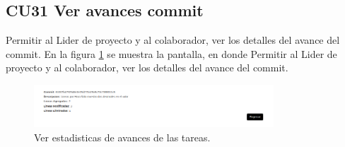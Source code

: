 \subsection{CU31 Ver avances commit}
{
\justify
{}
}

\justify
Permitir al Lider de proyecto y al colaborador, ver los detalles del avance del commit.
{
\justify
{}
}
\justify
En la figura \ref{fig:IU31} se muestra la pantalla, en donde Permitir al Lider de proyecto y al colaborador, ver los detalles del avance del commit.

\begin{figure}[htb]
\centering
\includegraphics[width=0.8\textwidth]{./images/cu31-avance-commit.png}
\caption{Ver estadisticas de avances de las tareas.} \label{fig:IU31}
\end{figure}

\newpage